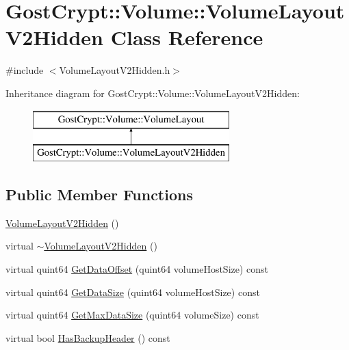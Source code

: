 \hypertarget{class_gost_crypt_1_1_volume_1_1_volume_layout_v2_hidden}{}\section{Gost\+Crypt\+:\+:Volume\+:\+:Volume\+Layout\+V2\+Hidden Class Reference}
\label{class_gost_crypt_1_1_volume_1_1_volume_layout_v2_hidden}


{\ttfamily \#include $<$Volume\+Layout\+V2\+Hidden.\+h$>$}

Inheritance diagram for Gost\+Crypt\+:\+:Volume\+:\+:Volume\+Layout\+V2\+Hidden\+:\begin{figure}[H]
\begin{center}
\leavevmode
\includegraphics[height=2.000000cm]{class_gost_crypt_1_1_volume_1_1_volume_layout_v2_hidden}
\end{center}
\end{figure}
\subsection*{Public Member Functions}
\begin{DoxyCompactItemize}
\item 
\hyperlink{class_gost_crypt_1_1_volume_1_1_volume_layout_v2_hidden_a3dac16451de6dd0af250efe2924eeabd}{Volume\+Layout\+V2\+Hidden} ()
\item 
virtual \hyperlink{class_gost_crypt_1_1_volume_1_1_volume_layout_v2_hidden_a8afcf4fff7b82f10e32274665ea8210f}{$\sim$\+Volume\+Layout\+V2\+Hidden} ()
\item 
virtual quint64 \hyperlink{class_gost_crypt_1_1_volume_1_1_volume_layout_v2_hidden_aa03f496e4a734339f50a804ad7d0d3cf}{Get\+Data\+Offset} (quint64 volume\+Host\+Size) const
\item 
virtual quint64 \hyperlink{class_gost_crypt_1_1_volume_1_1_volume_layout_v2_hidden_ad38f4c055cdb8000bd193fdaa23a6828}{Get\+Data\+Size} (quint64 volume\+Host\+Size) const
\item 
virtual quint64 \hyperlink{class_gost_crypt_1_1_volume_1_1_volume_layout_v2_hidden_a784f7b8296b7b253f8255a124c977de0}{Get\+Max\+Data\+Size} (quint64 volume\+Size) const
\item 
virtual bool \hyperlink{class_gost_crypt_1_1_volume_1_1_volume_layout_v2_hidden_a6e62bb62c0d5747e089658516d443706}{Has\+Backup\+Header} () const
\end{DoxyCompactItemize}
